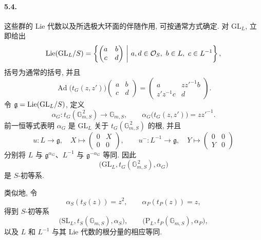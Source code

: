 \paragraph{\textbf{5.4.}}
这些群的 Lie 代数以及所选极大环面的伴随作用, 可按通常方式确定. 对 \(\mathrm{GL}_L\),  立即给出
\[
 \operatorname{Lie}(\mathrm{GL}_L/S)
 =
 \left\{
 \begin{pmatrix}a&b\\c&d\end{pmatrix}
 \ \middle|\
 a,d\in\mathcal O_S,\ b\in L,\ c\in L^{-1}
 \right\},
\]
括号为通常的括号, 并且
\[
 \operatorname{Ad}\bigl(t_G(z,z')\bigr)
 \begin{pmatrix}a&b\\c&d\end{pmatrix}
 =
 \begin{pmatrix}
 a&zz'^{-1}b\\
 z'z^{-1}c&d
 \end{pmatrix}.
\]
令 \(\mathfrak g=\operatorname{Lie}(\mathrm{GL}_L/S)\), 定义
\[
 \alpha_G\colon t_G(\mathbb G_{m,S}^{\,2})\longrightarrow
 \mathbb G_{m,S},
 \qquad
 \alpha_G\bigl(t_G(z,z')\bigr)=zz'^{-1}.
\]
前一恒等式表明 \(\alpha_G\) 是 \(\mathrm{GL}_L\) 关于 \(t_G(\mathbb G_{m,S}^{\,2})\) 的根, 并且
\[
 u\colon L\longrightarrow\mathfrak g,
 \quad X\longmapsto\begin{pmatrix}0&X\\0&0\end{pmatrix},
 \qquad
 u^-\colon L^{-1}\longrightarrow\mathfrak g,
 \quad Y\longmapsto\begin{pmatrix}0&0\\Y&0\end{pmatrix}
\]
分别将 \(L\) 与 \(\mathfrak g^{\alpha_G}\)、\(L^{-1}\) 与 \(\mathfrak g^{-\alpha_G}\) 等同. 因此
\[
 \bigl(\mathrm{GL}_L,t_G(\mathbb G_{m,S}^{\,2}),\alpha_G\bigr)
\]
是 \(S\)-初等系.

类似地, 令
\[
 \alpha_S(t_S(z))=z^2,
 \qquad
 \alpha_P(t_P(z))=z,
\]
得到 \(S\)-初等系
\[
 \bigl(\mathrm{SL}_L,t_S(\mathbb G_{m,S}),\alpha_S\bigr),
 \qquad
 \bigl(\mathrm P_L,t_P(\mathbb G_{m,S}),\alpha_P\bigr),
\]
以及 \(L\) 和 \(L^{-1}\) 与其 Lie 代数的根分量的相应等同.

